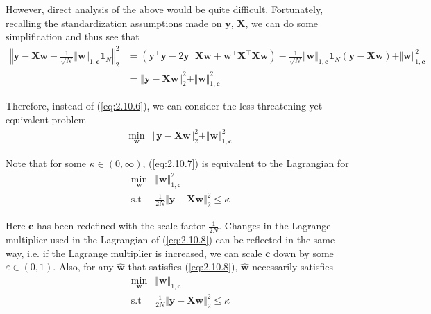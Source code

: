 \documentclass{article}
\numberwithin{equation}{section}
\begin{document}
However, direct analysis of the above would be quite difficult. Fortunately,
recalling the standardization assumptions made on $ \mathbf{y} $,
$ \mathbf{X} $, we can do some simplification and thus see that
\begin{equation*}
    \begin{split}
        \left\Vert
            \mathbf{y} - \mathbf{Xw} -
            \frac{1}{\sqrt{N}}\Vert\mathbf{w}\Vert_{1, \mathbf{c}}\mathbf{1}_N
        \right\Vert_2^2 & =
        \left(
            \mathbf{y}^\top\mathbf{y} - 2\mathbf{y}^\top\mathbf{Xw} +
            \mathbf{w}^\top\mathbf{X}^\top\mathbf{Xw}
        \right) -
        \frac{1}{\sqrt{N}}\Vert\mathbf{w}\Vert_{1, \mathbf{c}}
        \mathbf{1}_N^\top(\mathbf{y} - \mathbf{Xw}) +
        \Vert\mathbf{w}\Vert_{1, \mathbf{c}}^2 \\
        & =
        \Vert\mathbf{y} - \mathbf{Xw}\Vert_2^2 +
        \Vert\mathbf{w}\Vert_{1, \mathbf{c}}^2
    \end{split}
\end{equation*}

Therefore, instead of (\ref{eq:2.10.6}), we can consider the less threatening
yet equivalent problem
\begin{equation} \label{eq:2.10.7}
    \begin{array}{rl}
        \displaystyle\min_\mathbf{w} &
        \Vert\mathbf{y} - \mathbf{Xw}\Vert_2^2 +
        \Vert\mathbf{w}\Vert_{1, \mathbf{c}}^2
    \end{array}
\end{equation}

Note that for some $ \kappa \in (0, \infty) $, (\ref{eq:2.10.7}) is equivalent
to the Lagrangian for
\begin{equation} \label{eq:2.10.8}
    \begin{array}{rl}
        \displaystyle\min_\mathbf{w} &
        \Vert\mathbf{w}\Vert_{1, \mathbf{c}}^2 \\
        \text{s.t} &
        \frac{1}{2N}\Vert\mathbf{y} - \mathbf{Xw}\Vert_2^2 \le \kappa
    \end{array}
\end{equation}

Here $ \mathbf{c} $ has been redefined with the scale factor $ \frac{1}{2N} $.
Changes in the Lagrange multiplier used in the Lagrangian of (\ref{eq:2.10.8})
can be reflected in the same way, i.e. if the Lagrange multiplier is increased,
we can scale $ \mathbf{c} $ down by some $ \varepsilon \in (0, 1) $. Also, for
any $ \hat{\mathbf{w}} $ that satisfies (\ref{eq:2.10.8}), $ \hat{\mathbf{w}} $
necessarily satisfies
\begin{equation} \label{eq:2.10.9}
    \begin{array}{rl}
        \displaystyle\min_\mathbf{w} & \Vert\mathbf{w}\Vert_{1, \mathbf{c}} \\
        \text{s.t} &
        \frac{1}{2N}\Vert\mathbf{y} - \mathbf{Xw}\Vert_2^2 \le \kappa
    \end{array}
\end{equation}
\end{document}
